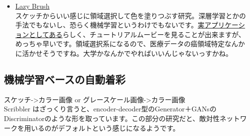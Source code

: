 \documentclass[a4paper, dvipdfmx, 10pt]{article}
\begin{document}
\begin{itemize}
\item \href{https://dcgi.fel.cvut.cz/home/sykorad/Sykora09-EG.pdf}{Lazy Brush}\\

スケッチからいい感じに領域選択して色を塗りつぶす研究。深層学習とかの手法でもないし、恐らく機械学習というわけでもないです。\href{http://animatetvp.blogspot.com/2015/01/lazybrush.html}{実アプリケーションとしてある}らしく、チュートリアルムービーを見ることが出来ますが、めっちゃ早いです。領域選択系になるので、医療データの癌領域特定なんかに活かせそうですね。大学かなんかでやればいいんじゃないっすかね。\\
\end{itemize}

\subsection{機械学習ベースの自動着彩}
\label{sec:orgf40f82f}
スケッチ->カラー画像 or グレースケール画像->カラー画像\\
Scribbler はざっくり言うと、encoder-decoder型のGenerator＋GANsのDiscriminatorのような形を取っています。この部分の研究だと、敵対性ネットワークを用いるのがデフォルトという感じになるようです。\\
\end{document}
